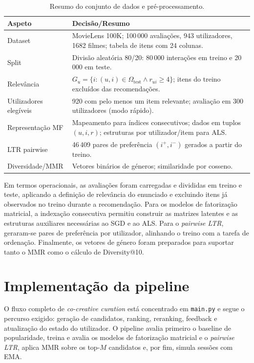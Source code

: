 \documentclass[10pt]{article}
\begin{document}
\begin{table}[H]
\centering
\small
\renewcommand{\arraystretch}{1.2}
\begin{tabular}{p{} p{}}
\toprule
\textbf{Aspeto} & \textbf{Decisão/Resumo} \\
\midrule
Dataset & MovieLens 100K; 100\,000 avaliações, 943 utilizadores, 1682 filmes; tabela de itens com 24 colunas. \\
Split & Divisão aleatória 80/20: 80\,000 interações em treino e 20\,000 em teste. \\
Relevância & $G_u = \{ i : (u,i)\in\Omega_{\text{test}} \wedge r_{ui} \ge 4 \}$; itens do treino excluídos das recomendações. \\
Utilizadores elegíveis & 920 com pelo menos um item relevante; avaliação em 300 utilizadores (modo rápido). \\
Representação MF & Mapeamento para índices consecutivos; dados em tuplos $(u,i,r)$; estruturas por utilizador/item para ALS. \\
LTR pairwise & 46\,409 pares de preferência $(i^+, i^-)$ gerados a partir do treino. \\
Diversidade/MMR & Vetores binários de géneros; similaridade por cosseno. \\
\bottomrule
\end{tabular}
\caption{Resumo do conjunto de dados e pré-processamento.}
\label{tab:dataset_preproc}
\end{table}

Em termos operacionais, as avaliações foram carregadas e divididas em treino e teste, aplicando a definição de relevância do enunciado e excluindo itens já observados no treino durante a recomendação. Para os modelos de fatorização matricial, a indexação consecutiva permitiu construir as matrizes latentes e as estruturas auxiliares necessárias ao SGD e ao ALS. Para o \textit{pairwise LTR}, geraram-se pares de preferência por utilizador, alinhando o treino com a tarefa de ordenação. Finalmente, os vetores de género foram preparados para suportar tanto o MMR como o cálculo de Diversity@10.






\section{Implementação da pipeline}

O fluxo completo de \textit{co-creative curation} está concentrado em \texttt{main.py} e segue o percurso exigido: geração de candidatos, ranking, reranking, feedback e atualização do estado do utilizador. O pipeline avalia primeiro o baseline de popularidade, treina e avalia os modelos de fatorização matricial e o \textit{pairwise LTR}, aplica MMR sobre os top-\(M\) candidatos e, por fim, simula sessões com EMA.
\end{document}

